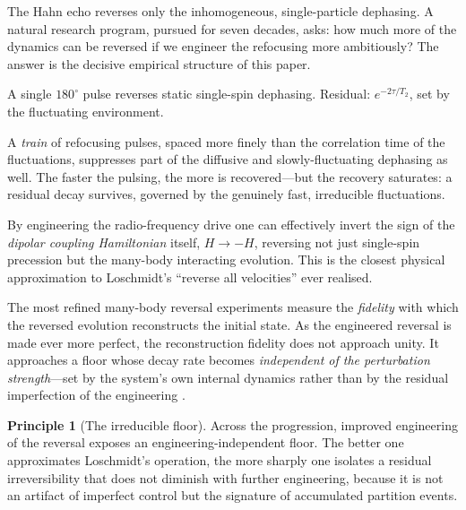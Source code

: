 \documentclass[11pt,a4paper]{article}
\theoremstyle{thmstyle}
\theoremstyle{definition}
\newtheorem{principle}[theorem]{Principle}
\theoremstyle{remark}
\newcommand{\Ttwo}{T_{2}}
\begin{document}
The Hahn echo reverses only the inhomogeneous, single-particle dephasing.
A natural research program, pursued for seven decades, asks: how much
more of the dynamics can be reversed if we engineer the refocusing more
ambitiously? The answer is the decisive empirical structure of this
paper.

\begin{description}[leftmargin=0em,itemsep=0.35em]
\item[Hahn echo \citep{hahn1950}.] A single $180^{\circ}$ pulse reverses
static single-spin dephasing. Residual: $e^{-2\tau/\Ttwo}$, set by the
fluctuating environment.

\item[Carr--Purcell--Meiboom--Gill (CPMG)
\citep{carr1954,meiboom1958}.] A \emph{train} of refocusing pulses,
spaced more finely than the correlation time of the fluctuations,
suppresses part of the diffusive and slowly-fluctuating dephasing as
well. The faster the pulsing, the more is recovered---but the recovery
saturates: a residual decay survives, governed by the genuinely fast,
irreducible fluctuations.

\item[Magic echo and many-body reversal
\citep{rhim1971}.] By engineering the radio-frequency drive one can
effectively invert the sign of the \emph{dipolar coupling Hamiltonian}
itself, $H\to-H$, reversing not just single-spin precession but the
many-body interacting evolution. This is the closest physical
approximation to Loschmidt's ``reverse all velocities'' ever realised.

\item[Polarization / Loschmidt echo
\citep{levstein1998,jalabert2001,gorin2006}.] The most refined
many-body reversal experiments measure the \emph{fidelity} with which the
reversed evolution reconstructs the initial state. As the engineered
reversal is made ever more perfect, the reconstruction fidelity does not
approach unity. It approaches a floor whose decay rate becomes
\emph{independent of the perturbation strength}---set by the system's own
internal dynamics rather than by the residual imperfection of the
engineering \citep{jalabert2001,gorin2006}.
\end{description}

\begin{principle}[The irreducible floor]
\label{prin:floor}
Across the progression, improved engineering of the reversal exposes an
engineering-independent floor. The better one approximates Loschmidt's
operation, the more sharply one isolates a residual irreversibility that
does not diminish with further engineering, because it is not an artifact
of imperfect control but the signature of accumulated partition events.
\end{principle}
\end{document}
